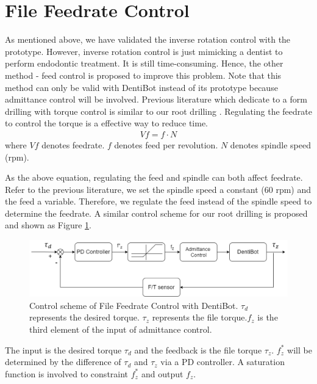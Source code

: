 \section{File Feedrate Control}
\label{sec:Feed Control}
\hspace*{6mm}As mentioned above, we have validated the inverse rotation control with the prototype. However, inverse rotation control is just mimicking a dentist to perform endodontic treatment. It is still time-consuming. Hence, the other method - feed control is proposed to improve this problem. Note that this method can only be valid with DentiBot instead of its prototype because admittance control will be involved. Previous literature which dedicate to a form drilling with torque control is similar to our root drilling \cite{boessler2009effect}. Regulating the feedrate to control the torque is a effective way to reduce time. 
\begin{equation*}
\begin{split}
V\!f = f \cdot N
\end{split}
\end{equation*}
where $V\!f$ denotes feedrate. $f$ denotes feed per revolution. $N$ denotes spindle speed (rpm).
\par
As the above equation, regulating the feed and spindle can both affect feedrate. Refer to the previous literature, we set the spindle speed a constant ($60$ rpm) and the feed a variable. Therefore, we regulate the feed instead of the spindle speed to determine the feedrate. A similar control scheme for our root drilling is proposed and shown as Figure \ref{fig: control shceme_fc}.
\begin{figure}[htbp]
\label{fig: control shceme_fc}
\begin{center}
\includegraphics[width=1\linewidth]{Images/feedrate_control.png}
\caption{Control scheme of File Feedrate Control with DentiBot. $\tau_d$ represents the desired torque. $\tau_z$ represents the file torque.$f_z$ is the third element of the input of admittance control.}
\end{center}
\end{figure}
\par\noindent
The input is the desired torque $\tau_d$ and the feedback is the file torque $\tau_z$. $f^*_z$ will be determined by the difference of $\tau_d$ and $\tau_z$ via a PD controller. A saturation function is involved to constraint $f^*_z$ and output $f_z$.

